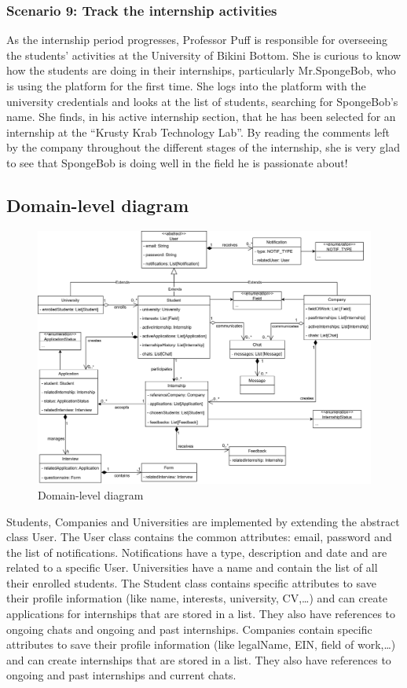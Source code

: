 \subsubsection{Scenario 9: Track the internship activities}\label{subsubsec:scenario_9}
As the internship period progresses, Professor Puff is responsible for overseeing the students' activities at the University of Bikini Bottom. 
She is curious to know how the students are doing in their internships, particularly Mr.SpongeBob, who is using the platform for the first time. 
She logs into the platform with the university credentials and looks at the list of students, searching for SpongeBob's name. She finds, 
in his active internship section, that he has been selected for an internship at the ``Krusty Krab Technology Lab''. By reading the comments
left by the company throughout the different stages of the internship, she is very glad to see that SpongeBob is doing well in the field he is 
passionate about!


\subsection{Domain-level diagram}\label{subsec:domain_level_diagram}
\begin{figure}[H]
    \centering
    \includegraphics[width=1\textwidth]{Images/UML_Class_diagram.png}
    \caption{Domain-level diagram}\label{fig:domain-lebel_diagram}
\end{figure}
Students, Companies and Universities are implemented by extending the abstract class User. The User class contains the common attributes: email, 
password and the list of notifications. Notifications have a type, description and date and are related to a specific User. Universities have a 
name and contain the list of all their enrolled students. The Student class contains specific attributes to save their profile information (like 
name, interests, university, CV,\ldots) and can create applications for internships that are stored in a list. They also have references to ongoing 
chats and ongoing and past internships. Companies contain specific attributes to save their profile information (like legalName, EIN, field of 
work,\ldots) and can create internships that are stored in a list. They also have references to ongoing and past internships and current chats. 

